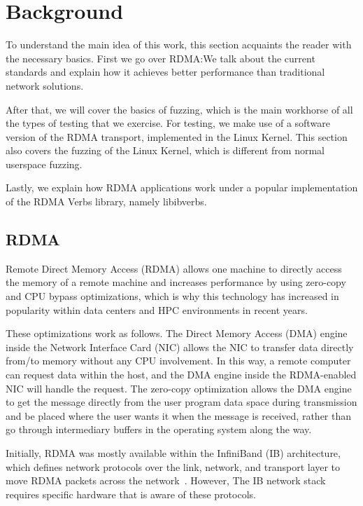 \section{Background}

To understand the main idea of this work, this section
acquaints the reader with the necessary
basics. First we go over RDMA:\@ We talk about the current standards
and explain how it achieves better performance than traditional network solutions.

After that, we will cover the basics of fuzzing, which is the main workhorse
of all the types of testing that we exercise. For testing, we make use of a software
version of the RDMA transport, implemented in the Linux Kernel. This section also
covers the fuzzing of the Linux Kernel,
which is different from normal userspace fuzzing.

Lastly, we explain how RDMA applications work
under a popular implementation of the RDMA Verbs library,
namely libibverbs.

\subsection{RDMA}

Remote Direct Memory Access (RDMA) allows one machine to
directly access the memory of a remote machine and increases
performance by using  zero-copy and CPU bypass optimizations\cite{kaliaUsingRDMAEfficiently2014},
which is why this technology has increased in popularity
within data centers and HPC environments in recent years.

These optimizations work as follows. The Direct Memory Access (DMA) engine inside the Network Interface Card (NIC) allows the NIC to
transfer data directly from/to memory without any CPU involvement\cite{pattersonComputerOrganizationDesign2016}.
In this way, a remote computer can request data within the host, and the DMA engine inside
the RDMA-enabled NIC will handle the request. The zero-copy optimization allows the DMA engine to get
the message directly from the user program data space during transmission
and be placed where the user wants it when the message is received,
rather than go through intermediary buffers in the operating system
along the way\cite{pattersonComputerOrganizationDesign2016}.

Initially, RDMA was mostly available within the InfiniBand (IB) architecture,
which defines network protocols over the link, network, and transport layer to move
RDMA packets across the network~\cite{infinibandvol107}. However, The IB network stack requires
specific hardware that is aware of these protocols.

